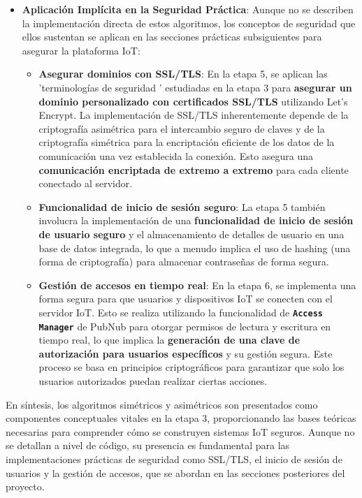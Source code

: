 \documentclass{report}
\begin{document}
\begin{itemize}
    \item \textbf{Aplicación Implícita en la Seguridad Práctica}: Aunque no se  describen la implementación directa de estos algoritmos, los 
    conceptos de seguridad que ellos sustentan se aplican en las secciones prácticas subsiguientes para asegurar la plataforma IoT:
    \begin{itemize}
        \item \textbf{Asegurar dominios con SSL/TLS}: En la etapa 5, se aplican las  'terminologías de seguridad ' estudiadas en la etapa 3 para 
        \textbf{asegurar un dominio personalizado con certificados SSL/TLS} utilizando Let's Encrypt. La implementación de SSL/TLS inherentemente depende 
        de la criptografía asimétrica para el intercambio seguro de claves y de la criptografía simétrica para la encriptación eficiente de los datos de 
        la comunicación una vez establecida la conexión. Esto asegura una \textbf{comunicación encriptada de extremo a extremo} para cada cliente conectado 
        al servidor.
        \item \textbf{Funcionalidad de inicio de sesión seguro}: La etapa 5 también involucra la implementación de una \textbf{funcionalidad de inicio 
        de sesión de usuario seguro} y el almacenamiento de detalles de usuario en una base de datos integrada, lo que a menudo implica el uso de hashing 
        (una forma de criptografía) para almacenar contraseñas de forma segura.
        \item \textbf{Gestión de accesos en tiempo real}: En la etapa 6, se implementa una forma segura para que usuarios y dispositivos IoT se conecten 
        con el servidor IoT. Esto se realiza utilizando la funcionalidad de \textbf{\texttt{Access Manager}} de PubNub para otorgar permisos de lectura y 
        escritura en tiempo real, lo que implica la \textbf{generación de una clave de autorización para usuarios específicos} y su gestión segura. 
        Este proceso se basa en principios criptográficos para garantizar que solo los usuarios autorizados puedan realizar ciertas acciones.
    \end{itemize}
\end{itemize}
En síntesis, los algoritmos simétricos y asimétricos son presentados como componentes conceptuales vitales en la etapa 3, proporcionando las bases 
teóricas necesarias para comprender cómo se construyen sistemas IoT seguros. Aunque no se detallan a nivel de código, su presencia es fundamental para 
las implementaciones prácticas de seguridad como SSL/TLS, el inicio de sesión de usuarios y la gestión de accesos, que se abordan en las secciones 
posteriores del proyecto.
\end{document}
